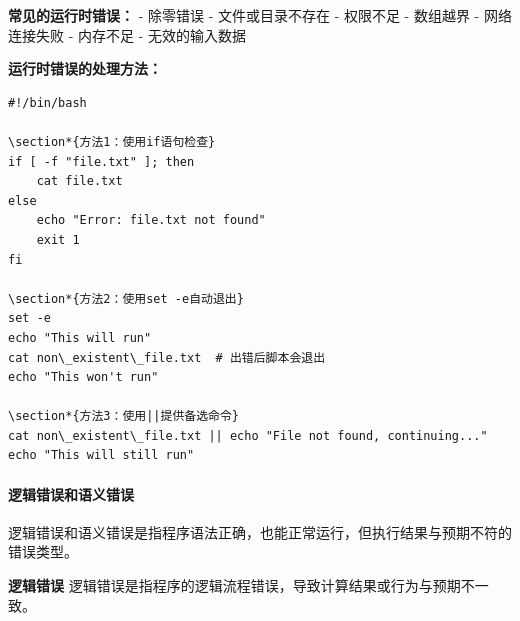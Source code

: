 \documentclass[12pt,UTF8]{ctexbook}
\begin{document}
\textbf{常见的运行时错误：}
- 除零错误
- 文件或目录不存在
- 权限不足
- 数组越界
- 网络连接失败
- 内存不足
- 无效的输入数据

\textbf{运行时错误的处理方法：}
\begin{verbatim}
#!/bin/bash

\section*{方法1：使用if语句检查}
if [ -f "file.txt" ]; then
    cat file.txt
else
    echo "Error: file.txt not found"
    exit 1
fi

\section*{方法2：使用set -e自动退出}
set -e
echo "This will run"
cat non\_existent\_file.txt  # 出错后脚本会退出
echo "This won't run"

\section*{方法3：使用||提供备选命令}
cat non\_existent\_file.txt || echo "File not found, continuing..."
echo "This will still run"
\end{verbatim}

\paragraph{逻辑错误和语义错误}
逻辑错误和语义错误是指程序语法正确，也能正常运行，但执行结果与预期不符的错误类型。

\textbf{逻辑错误}
逻辑错误是指程序的逻辑流程错误，导致计算结果或行为与预期不一致。
\end{document}
